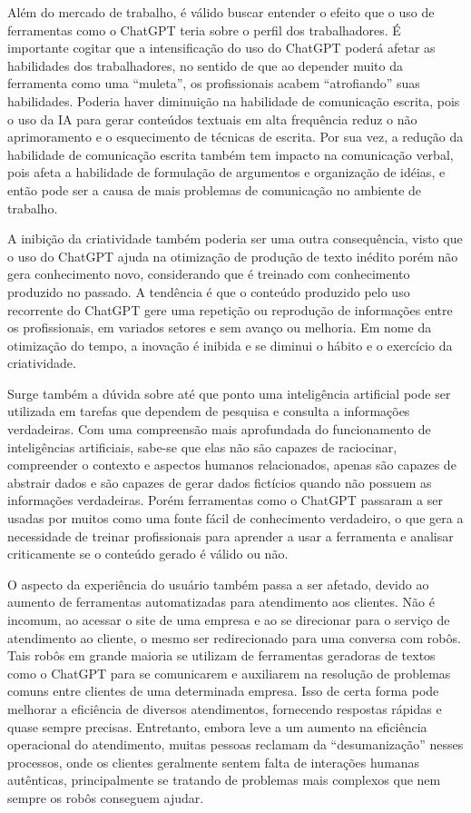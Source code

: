 Além do mercado de trabalho, é válido buscar entender o efeito que o uso de ferramentas como o ChatGPT teria sobre o perfil dos trabalhadores. É importante cogitar que a intensificação do uso do ChatGPT poderá afetar as habilidades dos trabalhadores, no sentido de que ao depender muito da ferramenta como uma “muleta”, os profissionais acabem “atrofiando” suas habilidades. Poderia haver diminuição na habilidade de comunicação escrita, pois o uso da IA para gerar conteúdos textuais em alta frequência reduz o não aprimoramento e o esquecimento de técnicas de escrita. Por sua vez, a redução da habilidade de comunicação escrita também tem impacto na comunicação verbal, pois afeta a habilidade de formulação de argumentos e organização de idéias, e então pode ser a causa de mais problemas de comunicação no ambiente de trabalho. 

A inibição da criatividade também poderia ser uma outra consequência, visto que o uso do ChatGPT ajuda na otimização de produção de texto inédito porém não gera conhecimento novo, considerando que é treinado com conhecimento produzido no passado. A tendência é que o conteúdo produzido pelo uso recorrente do ChatGPT gere uma repetição ou reprodução de informações entre os profissionais, em variados setores e sem avanço ou melhoria. Em nome da otimização do tempo, a inovação é inibida e se diminui o hábito e o exercício da criatividade.

Surge também a dúvida sobre até que ponto uma inteligência artificial pode ser utilizada em tarefas que dependem de pesquisa e consulta a informações verdadeiras. Com uma compreensão mais aprofundada do funcionamento de inteligências artificiais, sabe-se que elas não são capazes de raciocinar, compreender o contexto e aspectos humanos relacionados, apenas são capazes de abstrair dados e são capazes de gerar dados fictícios quando não possuem as informações verdadeiras. Porém ferramentas como o ChatGPT passaram a ser usadas por muitos como uma fonte fácil de conhecimento verdadeiro, o que gera a necessidade de treinar profissionais para aprender a usar a ferramenta e analisar criticamente se o conteúdo gerado é válido ou não.

O aspecto da experiência do usuário também passa a ser afetado, devido ao aumento de ferramentas automatizadas para atendimento aos clientes. Não é incomum, ao acessar o site de uma empresa e ao se direcionar para o serviço de atendimento ao cliente, o mesmo ser redirecionado para uma conversa com robôs. Tais robôs em grande maioria se utilizam de ferramentas geradoras de textos como o ChatGPT para se comunicarem e auxiliarem na resolução de problemas comuns entre clientes de uma determinada empresa. Isso de certa forma pode melhorar a eficiência de diversos atendimentos, fornecendo respostas rápidas e quase sempre precisas. Entretanto, embora leve a um aumento na eficiência operacional do atendimento, muitas pessoas reclamam da “desumanização” nesses processos, onde os clientes geralmente sentem falta de interações humanas autênticas, principalmente se tratando de problemas mais complexos que nem sempre os robôs conseguem ajudar. 


